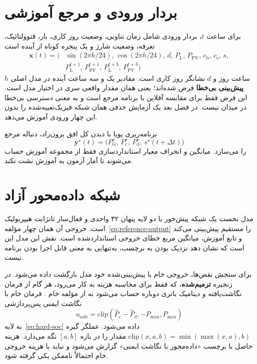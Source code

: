 \section{بردار ورودی و مرجع آموزشی}
برای ساعت $t$، بردار ورودی شامل زمان تناوبی، وضعیت روز کاری، بار، فتوولتائیک، تعرفه، وضعیت شارژ و یک پنجره کوتاه از آینده است
\begin{equation}
\begin{split}
  \bm{x}(t)=\bigl(&\sin(2\pi h/24),\,\cos(2\pi h/24),\,d,\,P_{\mathrm{L}},\,P_{\mathrm{PV}},\,c_{\mathrm{b}},\,c_{\mathrm{s}},\,s,\\
  &P_{\mathrm{L}}^{t+1},\,P_{\mathrm{PV}}^{t+1},\,P_{\mathrm{L}}^{t+3},\,P_{\mathrm{PV}}^{t+3}\bigr)
\end{split}
  \label{eq:model-input}
\end{equation}
$h$ ساعت روز و $d$ نشانگر روز کاری است. مقادیر یک و سه ساعت آینده در مدل اصلی \textbf{پیش‌بینی بی‌خطا} فرض شده‌اند؛ یعنی همان مقدار واقعی سری در اختیار مدل است. این فرض فقط برای مقایسه آفلاین با برنامه مرجع است و به معنی دسترسی بی‌خطا در میدان نیست. در فصل بعد یک آزمایش حذفی همان شبکه فیزیک‌تعبیه‌شده را بدون این چهار ورودی آموزش می‌دهد.

برنامه‌ریزی پویا با دیدن کل افق برون‌زاد، دنباله مرجع
\begin{equation}
  \bm{y}^{\star}(t)=\bigl(P_{\mathrm{G}}^{\star},\,P_{\mathrm{c}}^{\star},\,P_{\mathrm{d}}^{\star},\,s^{\star}(t+\Delta t)\bigr)
  \label{eq:reference-output}
\end{equation}
را می‌سازد. میانگین و انحراف معیار استانداردسازی فقط از مجموعه آموزش حساب می‌شوند تا آمار آزمون به آموزش نشت نکند.

\section{شبکه داده‌محور آزاد}
مدل نخست یک شبکه پیش‌خور با دو لایه پنهان ۳۲ واحدی و فعال‌ساز تانژانت هیپربولیک است. خروجی آن همان چهار مؤلفه~\eqref{eq:reference-output} را مستقیم پیش‌بینی می‌کند و تابع آموزش، میانگین مربع خطای خروجی استانداردشده است. نقش این مدل این است که نشان دهد نزدیک بودن به برچسب، به‌تنهایی به معنی قابل اجرا بودن برنامه نیست.

برای سنجش نقض‌ها، خروجی خام با  پیش‌بینی‌شده خود مدل بازگشت داده می‌شود. در زنجیره \textbf{ترمیم‌شده}، که فقط برای محاسبه هزینه به کار می‌رود،  هر گام از فرمان نگاشت‌یافته و دینامیک باتری دوباره حساب می‌شود نه از مؤلفه خام . فرمان خام با نگاشت ایمنی پس‌پردازشی
\begin{equation}
  u_{\mathrm{safe}}=\mathrm{clip}(\hat{P}_{\mathrm{c}}-\hat{P}_{\mathrm{d}},-P_{\max},P_{\max})
  \label{eq:usafe}
\end{equation}
به لایه~\eqref{eq:hard-soc} داده می‌شود. عملگر گیره $\mathrm{clip}(x,a,b)=\min(\max(x,a),b)$ مقدار را در بازه $[a,b]$ نگه می‌دارد. هزینه حاصل با برچسب «داده‌محور با نگاشت ایمنی» گزارش می‌شود و نباید با هزینه خروجی خام احتمالاً ناممکن یکی گرفته شود.

